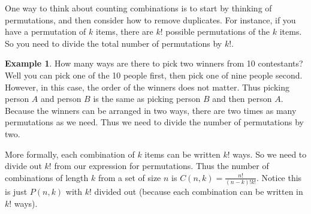 \documentclass[]{article}
\theoremstyle{definition}
\newtheorem{exmp}{Example}[section]
\begin{document}
\noindent One way to think about counting combinations is to start by thinking of permutations, and then consider how to remove duplicates. For instance, if you have a permutation of $k$ items, there are $k!$ possible permutations of the $k$ items. So you need to divide the total number of permutations by $k!$.

\begin{exmp}
How many ways are there to pick two winners from 10 contestants? Well you can pick one of the 10 people first, then pick one of nine people second. However, in this case, the order of the winners does not matter. Thus picking person $A$ and person $B$ is the same as picking person $B$ and then person $A$. Because the winners can be arranged in two ways, there are two times as many permutations as we need. Thus we need to divide the number of permutations by two. 
\end{exmp} 

\noindent More formally, each combination of $k$ items can be written $k!$ ways. So we need to divide out $k!$ from our expression for permutations. Thus the number of combinations of length $k$ from a set of size $n$ is $C(n,k) = \frac{n!}{(n-k)!k!}$. Notice this is just $P(n,k)$ with $k!$ divided out (because each combination can be written in $k!$ ways).
\end{document}

